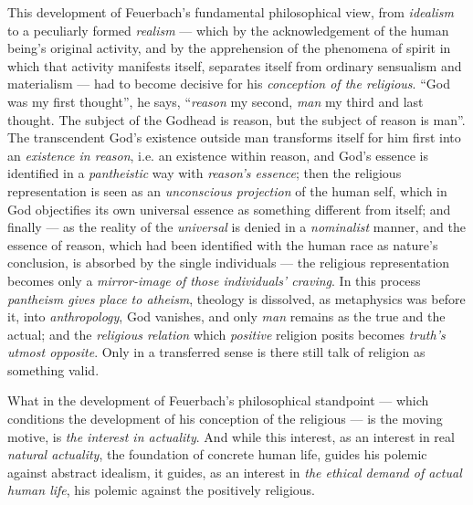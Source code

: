 \documentclass[12pt,a4paper]{book}
\begin{document}
This development of Feuerbach's fundamental philosophical view, from
\emph{idealism} to a peculiarly formed \emph{realism} --- which by the
acknowledgement of the human being's original activity, and by the
apprehension of the phenomena of spirit in which that activity manifests
itself, separates itself from ordinary sensualism and materialism --- had to
become decisive for his \emph{conception of the religious}. ``God was my first
thought'', he says, ``\emph{reason} my second, \emph{man} my third and last
thought. The subject of the Godhead is reason, but the subject of reason is
man''. The transcendent God's existence outside man transforms itself for him
first into an \emph{existence in reason}, i.e. an existence within reason, and
God's essence is identified in a \emph{pantheistic} way with \emph{reason's
essence}; then the religious representation is seen as an \emph{unconscious
projection} of the human self, which in God objectifies its own universal
essence as something different from itself; and finally --- as the reality of
the \emph{universal} is denied in a \emph{nominalist} manner, and the essence
of reason, which had been identified with the human race as nature's
conclusion, is absorbed by the single individuals --- the religious
representation becomes only a
\emph{mirror-image of those individuals' craving}. In this process
\emph{pantheism gives place to atheism}, theology is dissolved, as metaphysics
was before it, into \emph{anthropology}, God vanishes, and only \emph{man}
remains as the true and the actual; and the \emph{religious relation} which
\emph{positive} religion posits becomes \emph{truth's utmost opposite}. Only
in a transferred sense is there still talk of religion as something valid.

What in the development of Feuerbach's philosophical standpoint --- which
conditions the development of his conception of the religious --- is the
moving motive, is \emph{the interest in actuality}. And while this interest,
as an interest in real \emph{natural actuality}, the foundation of concrete
human life, guides his polemic against abstract idealism, it guides, as an
interest in \emph{the ethical demand of actual human life}, his polemic
against the positively religious.
\end{document}
